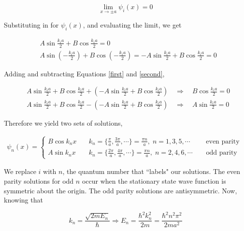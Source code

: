 \[
  \lim_{x \to \pm a} \psi_i(x) = 0
\] \vspace{3px}

Substituting in for $\psi_i(x)$, and evaluating the limit, we get

\begin{align}
&A\sin \frac{k_i a}{2} + B\cos \frac{k_i a}{2} = 0 \label{first}\\
&A\sin \left( -\frac{k_ia}{2} \right) + B\cos \left( -\frac{k_i a}{2} \right)
= -A \sin \frac{k_i a}{2} + B\cos \frac{k_i a}{2} = 0 \label{second} 
\end{align} \vspace{3px}

Adding and subtracting Equations \ref{first} and \ref{second},

\begin{align} \label{}
  &A\sin \frac{k_i a}{2} + B\cos \frac{k_i a}{2} + \left( - A \sin \frac{k_i
  a}{2} + B\cos \frac{k_i a}{2}\right)  \quad \Rightarrow \quad B\cos \frac{k_i
a}{2} = 0 \\
  &A\sin \frac{k_i a}{2} + B\cos \frac{k_i a}{2} - \left( - A \sin \frac{k_i
  a}{2} + B\cos \frac{k_i a}{2} \right) \quad \Rightarrow \quad A \sin
  \frac{k_i a}{2} = 0 
\end{align}\vspace{3px}

Therefore we yield two sets of solutions, 

\begin{align} \label{}
  \psi_n(x) = \begin{cases}
    B \cos k_n x &\quad k_n = \{ \frac{\pi}{a}, \frac{3\pi}{a}, \cdots \}
    = \frac{\pi n }{a}, \;  n = 1, 3, 5, \cdots \qquad \text{ even parity } \\
    A \sin k_n x &\quad k_n = \{ \frac{2\pi}{a}, \frac{4\pi}{a}, \cdots \}
    = \frac{\pi n}{a}, \;  n = 2, 4, 6, \cdots \qquad \text{odd parity} 
  \end{cases} 
\end{align}\vspace{3px}

We replace $i$ with $n$, the quantum number that ``labels" our solutions. The
even parity solutions for odd $n$ occur when the stationary state wave function is symmetric
about the origin. The odd parity solutions are antisymmetric. Now, knowing that 

\[
k_n = \frac{\sqrt{2mE_n}}{\hbar} \Rightarrow E_n = \frac{\hbar^2 k_n^2}{2m}
= \frac{\hbar^2 n^2 \pi^2}{2ma^2}
\] \vspace{3px}

